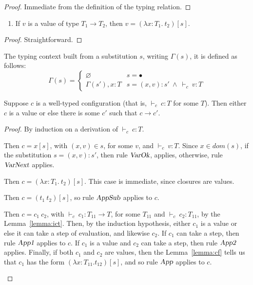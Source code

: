 \documentclass {article}
\newcommand{\tto}{\longrightarrow}
\newcommand{\absD}{\lambda x:T_1. \ t_2}
\newcommand{\conf}[2][s]{(#2)[#1]}
\newcommand{\Subx}{(x,v):s'}
\newcommand{\tyC}{{\vdash_c \ }}
\begin{document}
\begin{proof}Immediate from the definition of the typing relation.
\end{proof}

\begin{lemma} 
\label{lemma:cf}
\mbox{}
\begin{enumerate}
\item If $v$ is a value of type $T_1 \to T_2$, then $v = \conf{\absD}$.
\end{enumerate}
\end{lemma}

\begin{proof} Straightforward.
\end{proof}

\begin{definition}[$\Gamma(s)$]
\label{definition:tcs}
\mbox{}
The typing context built from a substitution $s$, writing $\Gamma(s)$, it is defined as follows:
\[ \Gamma(s) = \begin{cases} 
     \varnothing & s =  \bullet \\
      \Gamma(s'), x:T & s = (x,v):s' \ \land \ \tyC v : T 
   \end{cases}
\]
\end{definition}

\begin{theorem}[Progress]
\label{theorem:progress}
\mbox{}
Suppose $c$ is a well-typed configuration (that is, $ \tyC c : T$ for some $T$). Then either $c$ is a value or else there is some $c'$ such that $c \tto c'$.
\end{theorem}

\begin{proof} By induction on a derivation of $\tyC c : T$.
\begin{case}[TCVar]
Then $c = x[s]$, with $(x,v) \in s$, for some $v$,  and $\tyC v:T$. Since $x \in dom(s)$, if the substitution $s = \Subx$, then rule $\textsl {VarOk}$, applies, otherwise, rule $\textsl {VarNext}$ applies.
\end{case}

\begin{case}[TCAbs]
 Then $c = \conf{\absD}$. This case is immediate, since closures are values.
\end{case}

\begin{case}[TCApp] 
 Then $c = \conf{t_1 \ t_2}$, so rule $\textsl {AppSub}$ applies to $c$.
\end{case}

\begin{case}[TCCApp]
 Then $c = c_1 \ c_2$, with $\tyC c_1 : T_{11} \to T$, for some $T_{11}$ and $\tyC c_2 : T_{11}$, by the Lemma~\ref{lemma:ict}. Then, by the induction hypothesis, either $c_1$ is a value or else it can take a step of evaluation, and likewise $c_2$. If $c_1$ can take a step, then rule $\textsl {App1}$ applies to $c$. If $c_1$ is a value and $c_2$ can take a step, then rule $\textsl {App2}$ applies. Finally, if both $c_1$ and $c_2$ are values, then the Lemma~\ref{lemma:cf} tells us that $c_1$ has the form $\conf{\lambda x: T_{11}.t_{12}}$, and so rule $\textsl {App}$ applies to $c$.
\end{case}
\end{proof}
\end{document}
